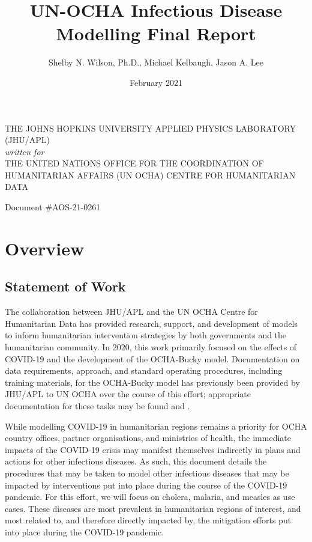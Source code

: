 \documentclass[letter,12pt, usenames,dvipsnames]{article}
\newcommand{\MYhref}[3][Blue]{\href{#2}{\color{#1}{#3}}}
\newcommand{\hash}{\#}
\begin{document}
\vfill
\title{UN-OCHA Infectious Disease Modelling Final Report}
\author{Shelby N. Wilson, Ph.D., Michael Kelbaugh, Jason A. Lee} 
\date{February 2021}

\maketitle

\vfill
\begin{center}
{\Large
THE JOHNS HOPKINS UNIVERSITY APPLIED PHYSICS LABORATORY (JHU/APL) \\ {\it written for}\\[1.3ex] THE UNITED NATIONS OFFICE FOR THE COORDINATION OF HUMANITARIAN AFFAIRS (UN OCHA) CENTRE FOR HUMANITARIAN DATA
}
\end{center}
Document \hash AOS-21-0261
\pagebreak
 

\section{Overview} 
\subsection{Statement of Work} 
The collaboration between JHU/APL and the UN OCHA Centre for Humanitarian Data has provided research, support, and development of models to inform humanitarian intervention strategies by both governments and the humanitarian community. In 2020, this work primarily focused on the effects of COVID-19 and the development of the OCHA-Bucky model. Documentation on data requirements, approach, and standard operating procedures, including training materials, for the OCHA-Bucky model has previously been provided by JHU/APL to UN OCHA over the course of this effort; appropriate documentation for these tasks may be found \MYhref{https://data.humdata.org/dataset/2048a947-5714-4220-905b-e662cbcd14c8/resource/2d9592f8-2980-4466-96f5-f0de23ea7ffa/download/ochabucky_final.pdf}{here} and .

While modelling COVID-19 in humanitarian regions remains a priority for OCHA country offices, partner organisations, and ministries of health, the immediate impacts of the COVID-19 crisis may manifest themselves indirectly in plans and actions for other infectious diseases.  As such, this document details the procedures that may be taken to model other infectious diseases that may be impacted by interventions put into place during the course of the COVID-19 pandemic.  For this effort, we will focus on cholera, malaria, and measles as use cases. These diseases are most prevalent in humanitarian regions of interest, and most related to, and therefore directly impacted by, the mitigation efforts put into place during the COVID-19 pandemic. 
\end{document}
